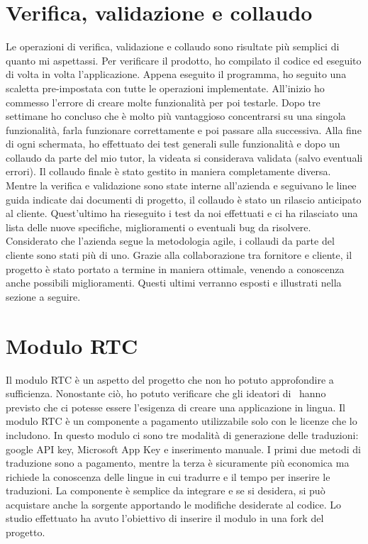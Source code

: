 \section{Verifica, validazione e collaudo}
Le operazioni di verifica, validazione e collaudo sono risultate più semplici di quanto mi aspettassi. Per verificare il prodotto, ho compilato il codice ed eseguito di volta in volta l'applicazione. 
Appena eseguito il programma, ho seguito una scaletta pre-impostata con tutte le operazioni implementate. All'inizio ho commesso l'errore di creare molte funzionalità per poi testarle. Dopo tre settimane ho concluso che è molto più vantaggioso concentrarsi su una singola funzionalità, farla funzionare correttamente e poi passare alla successiva.
Alla fine di ogni schermata, ho effettuato dei test generali sulle funzionalità e dopo un collaudo da parte del mio tutor, la videata  si considerava validata (salvo eventuali errori).  
Il collaudo finale è stato gestito in maniera completamente diversa. Mentre la verifica e validazione sono state interne all'azienda e seguivano le linee guida indicate dai documenti di progetto, il collaudo è stato un rilascio anticipato al cliente. Quest'ultimo ha rieseguito i test da noi effettuati e ci ha rilasciato una lista delle nuove specifiche, miglioramenti o eventuali bug da risolvere. 
Considerato che l'azienda segue la metodologia agile, i collaudi da parte del cliente sono stati più di uno. Grazie alla collaborazione tra fornitore e cliente, il progetto è stato portato a termine in maniera ottimale, venendo a conoscenza anche possibili miglioramenti.
Questi ultimi verranno esposti e illustrati nella sezione a seguire.

\section{Modulo RTC}
Il modulo RTC è un aspetto del progetto che non ho potuto approfondire a sufficienza. Nonostante ciò, ho potuto verificare che gli ideatori di \inde\ hanno previsto che ci potesse essere l'esigenza di creare una applicazione in lingua.
Il modulo RTC è un componente a pagamento utilizzabile solo con le licenze che lo includono. In questo modulo ci sono tre modalità di generazione delle traduzioni: google API key, Microsoft App Key e inserimento manuale. 
I primi due metodi di traduzione sono a pagamento, mentre la terza è sicuramente più economica ma richiede la conoscenza delle lingue in cui tradurre e il tempo per inserire le traduzioni.
La componente è semplice da integrare e se si desidera, si può acquistare anche la sorgente apportando le modifiche desiderate al codice.
Lo studio effettuato ha avuto l'obiettivo di inserire il modulo in una fork del progetto.

